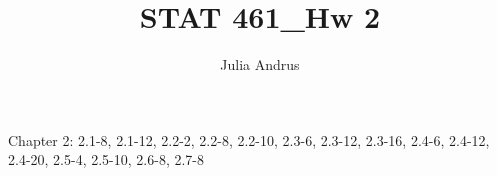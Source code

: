 \documentclass{article}
\title{STAT 461\_Hw 2}
\author{Julia Andrus}
\date{}
\begin{document}
\maketitle 


Chapter 2: 2.1-8, 2.1-12, 2.2-2, 2.2-8, 2.2-10, 2.3-6, 2.3-12, 2.3-16, 2.4-6, 2.4-12, 2.4-20, 2.5-4, 2.5-10, 2.6-8, 2.7-8
\end{document}

